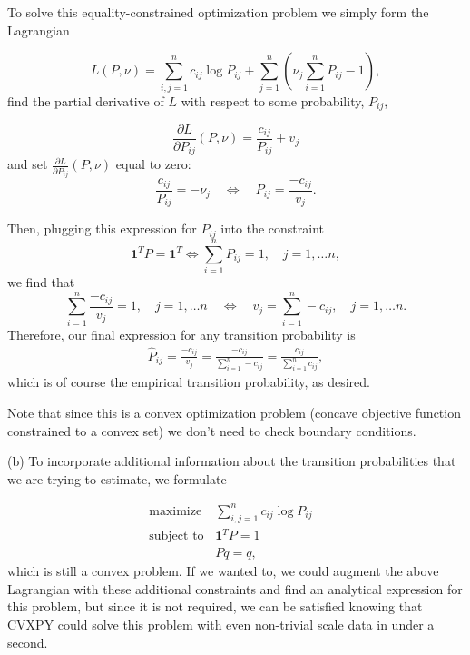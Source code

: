 \documentclass[12pt,reqno]{article}
\theoremstyle{definition}
\numberwithin{equation}{section}
\begin{document}
\noindent To solve this equality-constrained optimization problem we simply form the Lagrangian

\[L(P, \nu) = \sum_{i, j=1}^{n} c_{ij}\log P_{ij} + \sum_{j=1}^{n} \left(\nu_j \sum_{i=1}^{n}P_{ij} -1\right),\]
find the partial derivative of $L$ with respect to some probability, $P_{ij}$,

\[\frac{\partial L}{\partial P_{ij}}(P, \nu) = \frac{c_{ij}}{P_{ij}} + v_{j}\]
and set $\frac{\partial L}{\partial P_{ij}}(P, \nu)$ equal to zero:
\[\frac{c_{ij}}{P_{ij}} = - \nu_j \quad \Longleftrightarrow \quad P_{ij} = \frac{-c_{ij}}{v_{j}}.\]

\noindent Then, plugging this expression for $P_{ij}$ into the constraint 
\[\bm{1}^T P = \bm{1}^T \Longleftrightarrow \sum_{i=1}^{n}P_{ij}=1, \quad j = 1, \ldots n,\]
we find that
\[\sum_{i=1}^{n}\frac{-c_{ij}}{v_{j}} = 1, \quad j= 1, \ldots n \quad \Longleftrightarrow \quad v_j = \sum_{i=1}^{n}-c_{ij}, \quad j = 1, \ldots n.\]
Therefore, our final expression for any transition probability is
\[\begin{aligned}
    \hat{P}_{ij} = \frac{-c_{ij}}{v_{j}} = \frac{-c_{ij}}{\sum_{i=1}^{n}-c_{ij}} = \frac{c_{ij}}{\sum_{i=1}^{n}c_{ij}},
\end{aligned}\]
which is of course the empirical transition probability, as desired.

\noindent Note that since this is a convex optimization problem (concave objective function constrained to a convex set)
we don't need to check boundary conditions.

\vspace{0.1cm}
\noindent (b) To incorporate additional information about the transition probabilities that we are trying to estimate,
we formulate

\[\begin{array}{lll}
    \text{maximize} \; & \sum_{i, j=1}^{n} c_{ij}\log P_{ij} & \\
    \text{subject to} & \bm{1}^T P = 1 & \\
    & Pq = q,
    \end{array}\]
which is still a convex problem. If we wanted to, we could augment the above Lagrangian with
these additional constraints and find an analytical expression for this problem, but since it is not
required, we can be satisfied knowing that CVXPY could solve this problem with even non-trivial scale data
in under a second.
\end{document}
